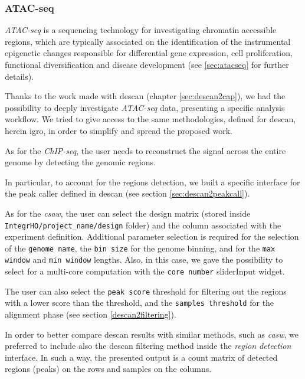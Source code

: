 \subsubsection{ATAC-seq} \label{sec:integrhoatac}

\textit{ATAC-seq} is a sequencing technology for investigating chromatin accessible regions, which are typically associated on the identification of the instrumental epigenetic changes responsible for differential gene expression, cell proliferation, functional diversification and disease development (see \ref{sec:atacseq} for further details).

Thanks to the work made with \gls{descan} (chapter \ref{sec:descan2cap}), we had the possibility to deeply investigate \textit{ATAC-seq} data, presenting a specific analysis workflow.
We tried to give access to the same methodologies, defined for \gls{descan}, herein \gls{igro}, in order to simplify and spread the proposed work.

As for the \textit{ChIP-seq}, the user needs to reconstruct the signal across the entire genome by detecting the genomic regions.

In particular, to account for the regions detection, we built a specific interface for the peak caller defined in \gls{descan} (see section \ref{sec:descan2peakcall}).

As for the \textit{csaw}, the user can select the design matrix (stored inside \lstinline!IntegrHO/project_name/design! folder) and the column associated with the experiment definition.
Additional parameter selection is required for the selection of the \lstinline!genome name!, the \lstinline!bin size! for the genome binning, and for the \lstinline!max window! and \lstinline!min window! lengths.
Also, in this case, we gave the possibility to select for a multi-core computation with the \lstinline!core number! sliderInput widget.

The user can also select the \lstinline!peak score! threshold for filtering out the regions with a lower score than the threshold, and the \lstinline!samples threshold! for the alignment phase (see section \ref{descan2filtering}).

In order to better compare \gls{descan} results with similar methods, such as \textit{casw}, we preferred to include also the \gls{descan} filtering method inside the \textit{region detection} interface.
In such a way, the presented output is a count matrix of detected regions (peaks) on the rows and samples on the columns.

